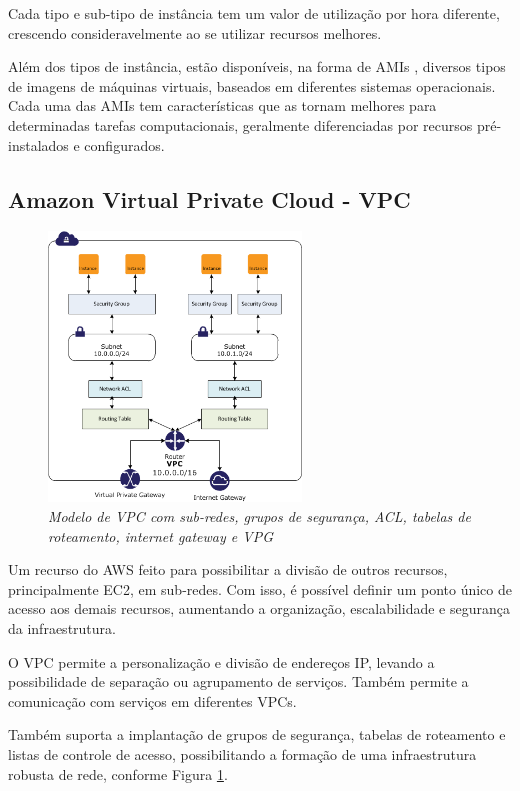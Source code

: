 \documentclass[tg]{mdtufsm}
\begin{document}
Cada tipo e sub-tipo de instância tem um valor de utilização por hora diferente, crescendo consideravelmente ao se utilizar recursos melhores.

Além dos tipos de instância, estão disponíveis, na forma de AMIs \cite{ami}, diversos tipos de imagens de máquinas virtuais, baseados em diferentes sistemas operacionais. Cada uma das AMIs tem características que as tornam melhores para determinadas tarefas computacionais, geralmente diferenciadas por recursos pré-instalados e configurados.
\subsection{Amazon Virtual Private Cloud - VPC}

\begin{figure}
	\centering
	\includegraphics[width=0.6\textwidth]{vpc}
	\caption{\emph{Modelo de VPC com sub-redes, grupos de segurança, ACL, tabelas de roteamento, internet gateway e VPG \cite{vpcimg}}}
	\label{fig:vpcImg}
\end{figure}

Um recurso do AWS feito para possibilitar a divisão de outros recursos, principalmente EC2, em sub-redes. Com isso, é possível definir um ponto único de acesso aos demais recursos, aumentando a organização, escalabilidade e segurança da infraestrutura.

O VPC permite a personalização e divisão de endereços IP, levando a possibilidade de separação ou agrupamento de serviços. Também permite a comunicação com serviços em diferentes VPCs.

Também suporta a implantação de grupos de segurança, tabelas de roteamento e listas de controle de acesso, possibilitando a formação de uma infraestrutura robusta de rede, conforme Figura \ref{fig:vpcImg}.
\end{document}
